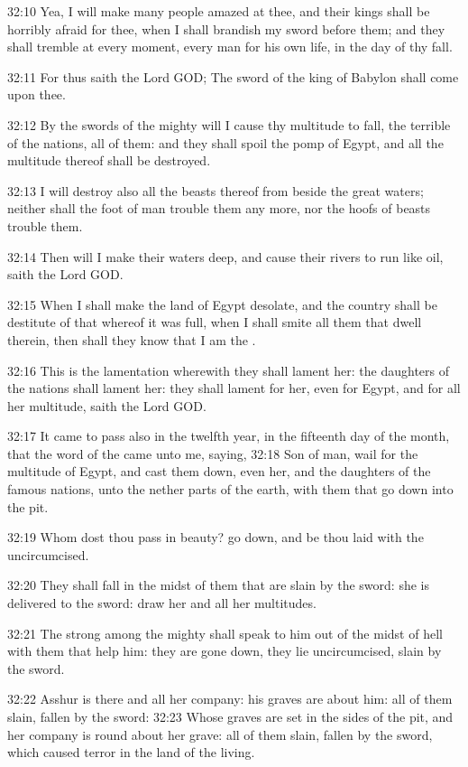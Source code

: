 32:10 Yea, I will make many people amazed at thee, and their kings shall be horribly afraid for thee, when I shall brandish my sword before them; and they shall tremble at every moment, every man for his own life, in the day of thy fall.

32:11 For thus saith the Lord GOD; The sword of the king of Babylon shall come upon thee.

32:12 By the swords of the mighty will I cause thy multitude to fall, the terrible of the nations, all of them: and they shall spoil the pomp of Egypt, and all the multitude thereof shall be destroyed.

32:13 I will destroy also all the beasts thereof from beside the great waters; neither shall the foot of man trouble them any more, nor the hoofs of beasts trouble them.

32:14 Then will I make their waters deep, and cause their rivers to run like oil, saith the Lord GOD.

32:15 When I shall make the land of Egypt desolate, and the country shall be destitute of that whereof it was full, when I shall smite all them that dwell therein, then shall they know that I am the \LORD.

32:16 This is the lamentation wherewith they shall lament her: the daughters of the nations shall lament her: they shall lament for her, even for Egypt, and for all her multitude, saith the Lord GOD.

32:17 It came to pass also in the twelfth year, in the fifteenth day of the month, that the word of the \LORD came unto me, saying, 32:18 Son of man, wail for the multitude of Egypt, and cast them down, even her, and the daughters of the famous nations, unto the nether parts of the earth, with them that go down into the pit.

32:19 Whom dost thou pass in beauty? go down, and be thou laid with the uncircumcised.

32:20 They shall fall in the midst of them that are slain by the sword: she is delivered to the sword: draw her and all her multitudes.

32:21 The strong among the mighty shall speak to him out of the midst of hell with them that help him: they are gone down, they lie uncircumcised, slain by the sword.

32:22 Asshur is there and all her company: his graves are about him: all of them slain, fallen by the sword: 32:23 Whose graves are set in the sides of the pit, and her company is round about her grave: all of them slain, fallen by the sword, which caused terror in the land of the living.

